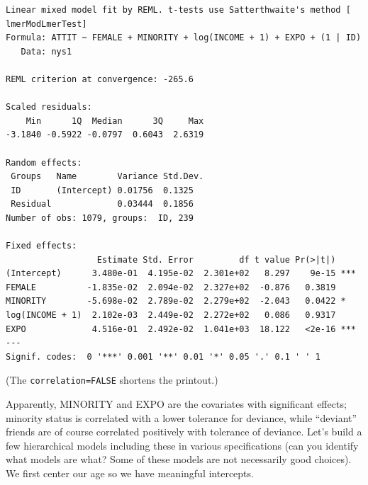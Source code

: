 \documentclass[
  letterpaper,
  DIV=11,
  numbers=noendperiod]{scrreprt}
\begin{document}
\begin{verbatim}
Linear mixed model fit by REML. t-tests use Satterthwaite's method [
lmerModLmerTest]
Formula: ATTIT ~ FEMALE + MINORITY + log(INCOME + 1) + EXPO + (1 | ID)
   Data: nys1

REML criterion at convergence: -265.6

Scaled residuals: 
    Min      1Q  Median      3Q     Max 
-3.1840 -0.5922 -0.0797  0.6043  2.6319 

Random effects:
 Groups   Name        Variance Std.Dev.
 ID       (Intercept) 0.01756  0.1325  
 Residual             0.03444  0.1856  
Number of obs: 1079, groups:  ID, 239

Fixed effects:
                  Estimate Std. Error         df t value Pr(>|t|)    
(Intercept)      3.480e-01  4.195e-02  2.301e+02   8.297    9e-15 ***
FEMALE          -1.835e-02  2.094e-02  2.327e+02  -0.876   0.3819    
MINORITY        -5.698e-02  2.789e-02  2.279e+02  -2.043   0.0422 *  
log(INCOME + 1)  2.102e-03  2.449e-02  2.272e+02   0.086   0.9317    
EXPO             4.516e-01  2.492e-02  1.041e+03  18.122   <2e-16 ***
---
Signif. codes:  0 '***' 0.001 '**' 0.01 '*' 0.05 '.' 0.1 ' ' 1
\end{verbatim}

(The \texttt{correlation=FALSE} shortens the printout.)

Apparently, MINORITY and EXPO are the covariates with significant
effects; minority status is correlated with a lower tolerance for
deviance, while ``deviant'' friends are of course correlated positively
with tolerance of deviance. Let's build a few hierarchical models
including these in various specifications (can you identify what models
are what? Some of these models are not necessarily good choices). We
first center our age so we have meaningful intercepts.
\end{document}
